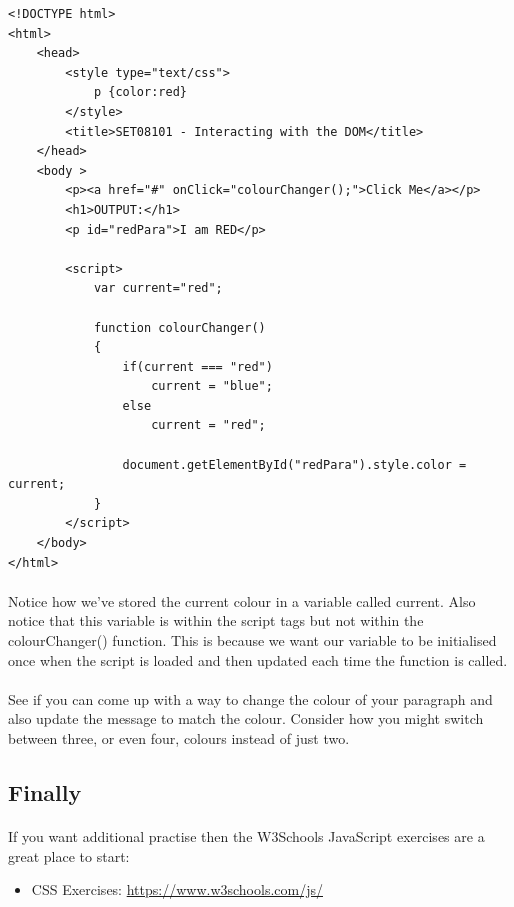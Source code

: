 \documentclass[10pt, a4paper, twosize]{article}
\begin{document}
\begin{lstlisting}
<!DOCTYPE html>
<html>
    <head>
        <style type="text/css">
            p {color:red}
        </style>
        <title>SET08101 - Interacting with the DOM</title>
    </head>
    <body >
        <p><a href="#" onClick="colourChanger();">Click Me</a></p>
        <h1>OUTPUT:</h1>
        <p id="redPara">I am RED</p>

        <script>
            var current="red";
            
            function colourChanger() 
            { 
                if(current === "red")
                    current = "blue";
                else
                    current = "red";

                document.getElementById("redPara").style.color = current;
            }      
        </script>
    </body>
</html>
\end{lstlisting}

\paragraph{} Notice how we've stored the current colour in a variable called current. Also notice that this variable is within the script tags but not within the colourChanger() function. This is because we want our variable to be initialised once when the script is loaded and then updated each time the function is called.

\paragraph{} See if you can come up with a way to change the colour of your paragraph and also update the message to match the colour. Consider how you might switch between three, or even four, colours instead of just two.


\subsection{Finally}
\paragraph{} If you want additional practise then the W3Schools JavaScript exercises are a great place to start:
\begin{itemize}
\item CSS Exercises: \url{https://www.w3schools.com/js/}
\end{itemize}
\end{document}
